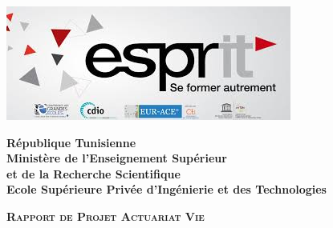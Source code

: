 \thispagestyle{cover}%
\hspace{-47pt}
\begin{minipage}[l]{0.2\columnwidth}
\vspace{6mm}
\includegraphics[scale=0.4]{img/esprit.jpg}\\
\end{minipage}
\hfill
\begin{minipage}[l]{0.6\columnwidth}
\centering
\footnotesize
\hspace{2mm}
\textbf{{République Tunisienne}}\\
\vspace{1.5mm}
\textbf{{Ministère de l'Enseignement Supérieur\\
et de la Recherche Scientifique}}\\
\vspace{2mm}
\hspace{1cm}
\textbf{{Ecole Supérieure Privée d'Ingénierie et des Technologies}}\\
\vspace{1.5mm}

\end{minipage}
\hfill
\begin{minipage}[l]{0.02\columnwidth}
\end{minipage}
\hfill
\begin{minipage}[l]{0.2\columnwidth}
\vspace{6mm}

\end{minipage}
\vskip3cm

\begin{center}
{\LARGE{\textbf{\textsc{Rapport de Projet Actuariat Vie}}}}\\
\vskip0.5cm
\large

\end{center}

